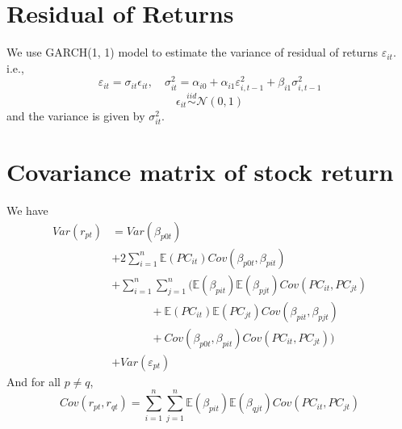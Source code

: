\documentclass{article}
\begin{document}
\section{Residual of Returns}
We use GARCH(1, 1) model to estimate the variance of residual of returns $\varepsilon_{it}$. i.e., 
\begin{equation*}
	\varepsilon_{it}=\sigma_{it} \epsilon_{it}, \quad \sigma_{it}^2=\alpha_{i0}+\alpha_{i1} \varepsilon_{i,t-1}^2+ \beta_{i1} \sigma_{i,t-1}^2
\end{equation*}
\begin{equation*}
    \epsilon_{it} \stackrel{iid}{\sim} \mathcal{N}(0, 1)
\end{equation*}
and the variance is given by $\sigma_{it}^2$.

\section{Covariance matrix of stock return}
We have
\begin{align*}
    Var(r_{pt})&=Var(\beta_{p0t}) \\
    &+2\sum_{i=1}^n \mathbb{E}(PC_{it})Cov(\beta_{p0t},\beta_{pit}) \\
    &+\sum_{i=1}^n\sum_{j=1}^n(\mathbb{E}(\beta_{pit})\mathbb{E}(\beta_{pjt})Cov(PC_{it},PC_{jt}) \\
    &\qquad\quad\;\,+\mathbb{E}(PC_{it})\mathbb{E}(PC_{jt})Cov(\beta_{pit}, \beta_{pjt}) \\
    &\qquad\quad\;\,+Cov(\beta_{p0t},\beta_{pit})Cov(PC_{it},PC_{jt})) \\
    &+Var(\varepsilon_{pt})
\end{align*}
And for all $p\neq q$,
\begin{equation*}
    Cov(r_{pt},r_{qt}) = \sum_{i=1}^n\sum_{j=1}^n\mathbb{E}(\beta_{pit})\mathbb{E}(\beta_{qjt})Cov(PC_{it}, PC_{jt})
\end{equation*}
    
\end{document}
